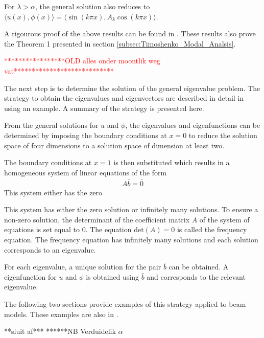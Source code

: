 \documentclass[../../main.tex]{subfiles}
\begin{document}
For $\lambda > \alpha$, the general solution also reduces to $\langle u(x) , \phi(x) \rangle = \langle \sin(k \pi x), A_k  \cos(k \pi x) \rangle$. 


A rigourous proof of the above results can be found in \cite{VV06}. These results also prove the Theorem 1 presented in section \ref{subsec:Timoshenko_Modal_Analsis}.



\textcolor{red}{*****************OLD alles onder moontlik weg vat****************************}

The next step is to determine the solution of the general eigenvalue problem. The strategy to obtain the eigenvalues and eigenvectors are described in detail in \cite{VV06} using an example. A summary of the strategy is presented here.

From the general solutions for $u$ and $\phi$, the eigenvalues and eigenfunctions can be determined by imposing the boundary conditions at $x=0$ to reduce the solution space of four dimensions to a solution space of dimension at least two. 

The boundary conditions at $x=1$ is then substituted which results in a homogeneous system of linear equations of the form
\begin{eqnarray*}
A \bar{b} = \bar{0}
\end{eqnarray*}
This system either has the zero


 This system has either the zero solution or infinitely many solutions. To ensure a non-zero solution, the determinant of the coefficient matrix $A$ of the system of equations is set equal to 0. The equation $\textrm{det}(A) = 0$ is called the frequency equation. The frequency equation has infinitely many solutions and each solution corresponds to an eigenvalue.
 
 For each eigenvalue, a unique solution for the pair $\bar{b}$ can be obtained. A eigenfunction for $u$ and $\phi$ is obtained using $\bar{b}$ and corresponds to the relevant eigenvalue.


The following two sections provide examples of this strategy applied to beam models. These examples are also in \cite{VV06}.

**sluit af***
******NB Verduidelik $\alpha$
\end{document}
